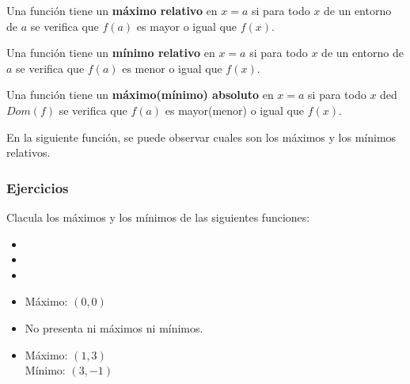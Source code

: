\begin{definition}
	Una función tiene un \textbf{máximo relativo} en $x=a$ si para todo $x$ de un entorno de $a$ se verifica que $f(a)$ es mayor o igual que $f(x)$.
\end{definition}

\begin{definition}
	Una función tiene un \textbf{mínimo relativo} en $x=a$ si para todo $x$ de un entorno de $a$ se verifica que $f(a)$ es menor o igual que $f(x)$.
\end{definition}

\begin{definition}
	Una función tiene un \textbf{máximo(mínimo) absoluto} en $x=a$ si para todo $x$ ded $Dom (f)$ se verifica que $f(a)$ es mayor(menor) o igual que $f(x)$.
\end{definition}

En la siguiente función, se puede observar cuales son los máximos y los mínimos relativos.
\subsubsection{Ejercicios}
\begin{ex}
	Clacula los máximos y los mínimos de las siguientes funciones:\\
	\begin{itemize}
		\item {}
		\item {}
		\item {}
	\end{itemize}
	\begin{sol}
		\begin{itemize}
			\item Máximo: $(0,0)$
			\item No presenta ni máximos ni mínimos.
			\item Máximo: $(1,3)$ \\ Mínimo: $(3,-1)$
		\end{itemize}
	\end{sol}
\end{ex}

\vspace{1cm}

